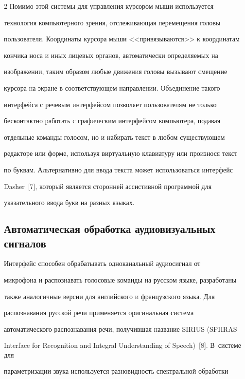 \begin{multicols}{2}
Помимо этой системы для управления курсором мыши используется 


технология компьютерного зрения, от\-сле\-жи\-ва\-ющая перемещения головы 


пользователя. Координаты курсора мыши <<привязываются>> к координатам 


кончика носа и иных лицевых органов, автоматически определяемых на 


изображении, таким образом любые движения головы вызывают смещение 


курсора на экране в соответствующем направлении. Объединение такого 


интерфейса с речевым интерфейсом позволяет пользователям не только 


бесконтактно работать с графическим интерфейсом компьютера, подавая 


отдельные команды голосом, но и набирать текст в любом существующем 


редакторе или форме, используя виртуальную клавиатуру или произнося текст 


по буквам. Альтернативно для ввода текста может использоваться интерфейс 


Dasher~[7], который является сторонней ассистивной программой для 


указательного ввода букв на разных языках.


  


\subsection{Автоматическая обработка аудиовизуальных сигналов}


  


  Интерфейс способен обрабатывать одноканальный аудиосигнал от 


микрофона и распознавать голосовые команды на русском языке, разработаны 


также аналогичные версии для английского и французского языка. Для 


распознавания русской речи применяется оригинальная система 


автоматического распознавания речи, получившая название SIRIUS (SPIIRAS 


Interface for Recognition and Integral Understanding of Speech)~[8]. В~системе для 


параметризации звука используется разновидность спектральной обработки 



\end{multicols}
